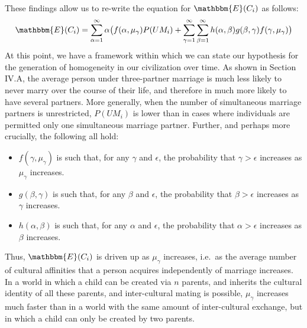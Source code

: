 These findings allow us to re-write the equation for $\mathbbm{E}(C_{i})$ as follows:\ 
\begin{equation}
    \mathbbm{E}(C_{i})=\sum_{\alpha=1}^{\infty}\alpha\big(f(\alpha,\mu_{\gamma})P(UM_{i}) + \sum_{\gamma=1}^{\infty}\sum_{\beta=1}^{\infty} h(\alpha,\beta)g(\beta,\gamma)f(\gamma,\mu_{\gamma})\big)
\end{equation}
At this point, we have a framework within which we can state our hypothesis for the generation of homogeneity in our civilization over time. As shown in Section IV.A, the average person under three-partner marriage is much less likely to never marry over the course of their life, and therefore in much more likely to have several partners. More generally, when the number of simultaneous marriage partners is unrestricted, $P(UM_{i})$ is lower than in cases where individuals are permitted only one simultaneous marriage partner. Further, and perhaps more crucially, the following all hold:\ 
\begin{itemize}
\item $f(\gamma,\mu_{\gamma})$ is such that, for any $\gamma$ and $\epsilon$, the probability that $\gamma>\epsilon$ increases as $\mu_{\gamma}$ increases.

\item $g(\beta,\gamma)$ is such that, for any $\beta$ and $\epsilon$, the probability that $\beta>\epsilon$ increases as $\gamma$ increases.

\item $h(\alpha,\beta)$ is such that, for any $\alpha$ and $\epsilon$, the probability that $\alpha>\epsilon$ increases as $\beta$ increases.

\end{itemize}
Thus, $\mathbbm{E}(C_{i})$ is driven up as $\mu_{\gamma}$ increases, i.e.\ as the average number of cultural affinities that a person acquires independently of marriage increases. In a world in which a child can be created via $n$ parents, and inherits the cultural identity of all these parents, and inter-cultural mating is possible, $\mu_{\gamma}$ increases much faster than in a world with the same amount of inter-cultural exchange, but in which a child can only be created by two parents.\par 
